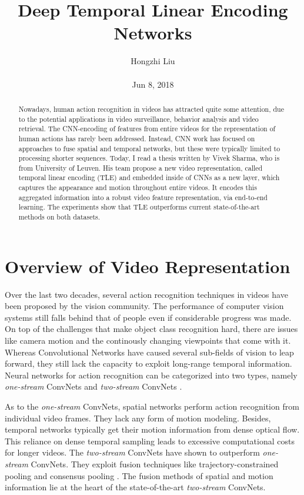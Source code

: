 \documentclass[10pt,twocolumn,letterpaper]{article}
\title{Deep Temporal Linear Encoding Networks}
\author{Hongzhi Liu\\\\
Jun 8, 2018}
\begin{document}
\maketitle
\begin{abstract}
	Nowadays, human action recognition in videos has attracted quite some attention, due to the potential applications in video surveillance, behavior analysis and video retrieval. The CNN-encoding of features from entire videos for the representation of human actions has rarely been addressed. Instead, CNN work has focused on approaches to fuse spatial and temporal networks, but these were typically limited to processing shorter sequences. Today, I read a thesis written by Vivek Sharma, who is from University of Leuven. His team propose a new video representation, called temporal linear encoding (TLE) and embedded inside of CNNs as a new layer, which captures the appearance and motion throughout entire videos. It encodes this aggregated information into a robust video feature representation, via end-to-end learning. The experiments show that TLE outperforms current state-of-the-art methods on both datasets.
\end{abstract}
\section{Overview of Video Representation}

Over the last two decades, several action recognition techniques in videos have been proposed by the vision community. The performance of computer vision systems still falls behind that of people even if considerable progress was made. On top of the challenges that make object class recognition hard, there are issues like camera motion and the continously changing viewpoints that come with it. Whereas Convolutional Networks have caused several sub-fields of vision to leap forward, they still lack the capacity to exploit long-range temporal information. Neural networks for action recognition can be categorized into two types, namely \emph{one-stream} ConvNets \cite{karpathy2014large} and \emph{two-stream} ConvNets \cite{simonyan2014two}. 

As to the \emph{one-stream} ConvNets, spatial networks perform action recognition from individual video frames. They lack any form of motion modeling. Besides, temporal networks typically get their motion information from dense optical flow. This reliance on dense temporal sampling leads to excessive computational costs for longer videos. The \emph{two-stream} ConvNets have shown to outperform \emph{one-stream} ConvNets. They exploit fusion techniques like trajectory-constrained pooling and consensus pooling \cite{wang2016temporal}. The fusion methods of spatial and motion information lie at the heart of the state-of-the-art \emph{two-stream} ConvNets.
\end{document}
